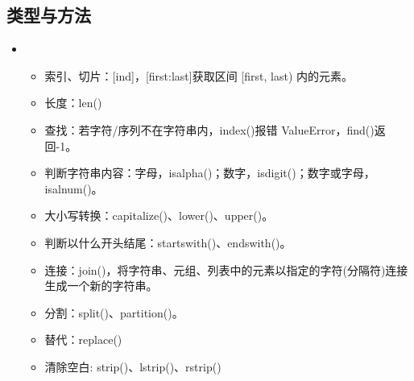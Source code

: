 \documentclass[letterpaper,10pt,english]{sphinxmanual}
\begin{document}
\subsection{类型与方法}
\label{\detokenize{python/08_basicType:id2}}\begin{itemize}
\item {} 
\begin{itemize}
\item {} 
索引、切片：{[}ind{]}，{[}first:last{]}获取区间 {[}first, last) 内的元素。

\item {} 
长度：len()

\item {} 
查找：若字符/序列不在字符串内，index()报错 ValueError，find()返回-1。

\item {} 
判断字符串内容：字母，isalpha()；数字，isdigit()；数字或字母，isalnum()。

\item {} 
大小写转换：capitalize()、lower()、upper()。

\item {} 
判断以什么开头结尾：startswith()、endswith()。

\item {} 
连接：join()，将字符串、元组、列表中的元素以指定的字符(分隔符)连接生成一个新的字符串。

\item {} 
分割：split()、partition()。 

\item {} 
替代：replace()

\item {} 
清除空白: strip()、lstrip()、rstrip()

\end{itemize}

%
\begin{sphinxVerbatim}[commandchars=\\\{\},numbers=left,firstnumber=1,stepnumber=1]
  
  \PYG{p}{[}  \PYG{p}{]}


\end{sphinxVerbatim}
\end{itemize}
\end{document}
